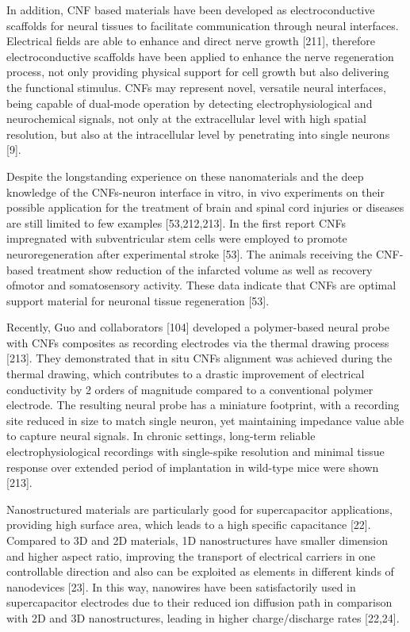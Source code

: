 In addition, CNF based materials have been developed as electroconductive scaffolds for neural tissues to facilitate communication through neural interfaces. Electrical fields are able to enhance and direct nerve growth [211], therefore electroconductive scaffolds have been applied to enhance the nerve regeneration process, not only providing physical support for cell growth but also delivering the functional stimulus. CNFs may represent novel, versatile neural interfaces, being capable of dual-mode operation by detecting electrophysiological and neurochemical signals, not only at the extracellular level with high spatial resolution, but also at the intracellular level by penetrating into single neurons [9].

Despite the longstanding experience on these nanomaterials and the deep knowledge of the CNFs-neuron interface in vitro, in vivo experiments on their possible application for the treatment of brain and spinal cord injuries or diseases are still limited to few examples [53,212,213]. In the first report CNFs impregnated with subventricular stem cells were employed to promote neuroregeneration after experimental stroke [53]. The animals receiving the CNF-based treatment show reduction of the infarcted volume as well as recovery ofmotor and somatosensory activity. These data indicate that CNFs are optimal support material for neuronal tissue regeneration [53].

Recently, Guo and collaborators [104] developed a polymer-based neural probe with CNFs composites as recording electrodes via the thermal drawing process [213]. They demonstrated that in situ CNFs alignment was achieved during the thermal drawing, which contributes to a drastic improvement of electrical conductivity by 2 orders of magnitude compared to a conventional polymer electrode. The resulting neural probe has a miniature footprint, with a recording site reduced in size to match single neuron, yet maintaining impedance value able to capture neural signals. In chronic settings, long-term reliable electrophysiological recordings with single-spike resolution and minimal tissue response over extended period of implantation in wild-type mice were shown [213].

Nanostructured materials are particularly good for supercapacitor applications, providing high surface area, which leads to a high specific capacitance [22]. Compared to 3D and 2D materials, 1D nanostructures have smaller dimension and higher aspect ratio, improving the transport of electrical carriers in one controllable direction and also can be exploited as elements in different kinds of nanodevices [23]. In this way, nanowires have been satisfactorily used in supercapacitor electrodes due to their reduced ion diffusion path in comparison with 2D and 3D nanostructures, leading in higher charge/discharge rates [22,24].

